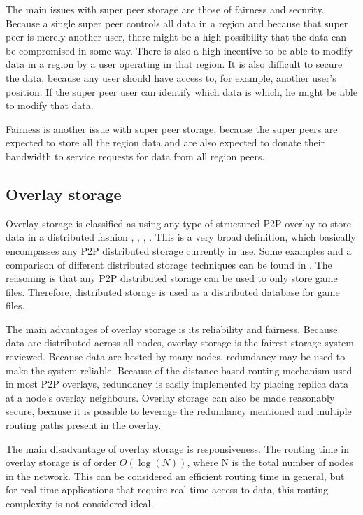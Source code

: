 \documentclass[10pt,a4paper,conference]{IEEEtran}
\begin{document}
The main issues with super peer storage are those of fairness and security. Because a single super peer controls all data in a region and because
that super peer is merely another user, there might be a high possibility that the data can be compromised in some way. There is also a high
incentive to be able to modify data in a region by a user operating in that region. It is also difficult to secure the data, because any user should
have access to, for example, another user's position. If the super peer user can identify which data is which, he might be able to modify that data.

Fairness is another issue with super peer storage, because the super peers are expected to store all the region data and are also expected to donate
their bandwidth to service requests for data from all region peers.


\subsection{Overlay storage}

Overlay storage is classified as using any type of structured P2P overlay to store data in a distributed fashion \cite{Douglas05enablingmassively},
\cite{using_freenet_storage}, \cite{Fan_phd}, \cite{past_storage_focus}. This is a very broad definition, which basically encompasses any P2P
distributed storage currently in use. Some examples and a comparison of different distributed storage techniques can be found in
\cite{Hasan_distributed_storage_survey}. The reasoning is that any P2P distributed storage can be used to only store game files. Therefore,
distributed storage is used as a distributed database for game files.

The main advantages of overlay storage is its reliability and fairness. Because data are distributed across all nodes, overlay storage is the fairest
storage system reviewed. Because data are hosted by many nodes, redundancy may be used to make the system reliable. Because of the distance based
routing mechanism used in most P2P overlays, redundancy is easily implemented by placing replica data at a node's overlay neighbours. Overlay storage
can also be made reasonably secure, because it is possible to leverage the redundancy mentioned and multiple routing paths present in the overlay.

The main disadvantage of overlay storage is responsiveness. The routing time in overlay storage is of order $O(\log(N))$, where N is the total number
of nodes in the network. This can be considered an efficient routing time in general, but for real-time applications that require real-time access to
data, this routing complexity is not considered ideal.
\end{document}
